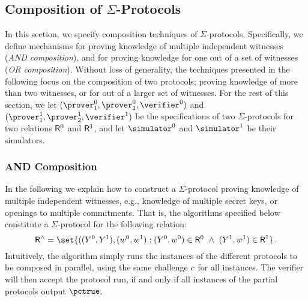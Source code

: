 \documentclass[runningheads,11pt]{article}
\begin{document}
\subsection{Composition of $\Sigma$-Protocols}
\label{sec:composition}
\label{sec:or-comp}
\label{sec:and-comp}
  In this section, we specify composition techniques of $\Sigma$-protocols.
  Specifically, we define mechanisms for proving knowledge of multiple independent witnesses (\emph{AND composition}), and for proving knowledge for one out of a set of witnesses (\emph{OR composition}).
  Without loss of generality, the techniques presented in the following focus on the composition of two protocols;
  proving knowledge of more than two witnesses, or for out of a larger set of witnesses.
  For the rest of this section, we let $(\prover_1^0,\prover_2^0,\verifier^0)$ and $(\prover_1^1,\prover_2^1,\verifier^1)$ be the specifications of two $\Sigma$-protocols for two relations $\mathsf{R}^0$ and $\mathsf{R}^1$, and let $\simulator^0$ and $\simulator^1$ be their simulators.

\subsubsection{AND Composition}
  In the following we explain how to construct a $\Sigma$-protocol proving knowledge of multiple independent witnesses, e.g., knowledge of multiple secret keys, or openings to multiple commitments.
  That is, the algorithms specified below constitute a $\Sigma$-protocol for the following relation:
\[
  \relation^\land = \set{
    ((\statement^0,\statement^1),(\witness^0,\witness^1) : (\statement^0,\witness^0)\in \relation^0 ~\land~ (\statement^1,\witness^1)\in\relation^1}\,.
\]
  Intuitively, the algorithm simply runs the instances of the different protocols to be composed in parallel, using the same challenge $c$ for all instances.
	The verifier will then accept the protocol run, if and only if all instances of the partial protocols output $\accept$.
\end{document}
